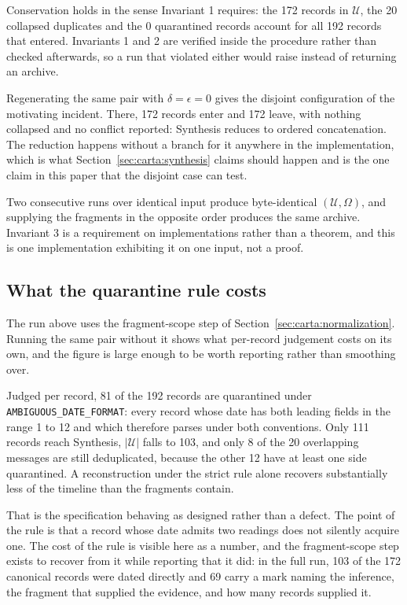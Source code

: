 Conservation holds in the sense Invariant 1 requires: the 172 records in
$\mathcal{U}$, the 20 collapsed duplicates and the 0 quarantined records account
for all 192 records that entered. Invariants 1 and 2 are verified inside the
procedure rather than checked afterwards, so a run that violated either would
raise instead of returning an archive.

Regenerating the same pair with $\delta = \epsilon = 0$ gives the disjoint
configuration of the motivating incident. There, 172 records enter and 172
leave, with nothing collapsed and no conflict reported: Synthesis reduces to
ordered concatenation. The reduction happens without a branch for it anywhere in
the implementation, which is what Section~\ref{sec:carta:synthesis} claims should
happen and is the one claim in this paper that the disjoint case can test.

Two consecutive runs over identical input produce byte-identical
$(\mathcal{U}, \Omega)$, and supplying the fragments in the opposite order
produces the same archive. Invariant 3 is a requirement on implementations
rather than a theorem, and this is one implementation exhibiting it on one input,
not a proof.

\subsection{What the quarantine rule costs}
\label{sec:evaluation:quarantine}

The run above uses the fragment-scope step of
Section~\ref{sec:carta:normalization}. Running the same pair without it shows
what per-record judgement costs on its own, and the figure is large enough to be
worth reporting rather than smoothing over.

Judged per record, 81 of the 192 records are quarantined under
\texttt{AMBIGUOUS\_DATE\_FORMAT}: every record whose date has both leading
fields in the range 1 to 12 and which therefore parses under both conventions.
Only 111 records reach Synthesis, $|\mathcal{U}|$ falls to 103, and only 8 of the
20 overlapping messages are still deduplicated, because the other 12 have at
least one side quarantined. A reconstruction under the strict rule alone recovers
substantially less of the timeline than the fragments contain.

That is the specification behaving as designed rather than a defect. The point of
the rule is that a record whose date admits two readings does not silently
acquire one. The cost of the rule is visible here as a number, and the
fragment-scope step exists to recover from it while reporting that it did: in the
full run, 103 of the 172 canonical records were dated directly and 69 carry a
mark naming the inference, the fragment that supplied the evidence, and how many
records supplied it.

